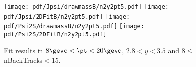 \begin{figure}[H]
\begin{center}
\texttt{[image: pdf/Jpsi/drawmassB/n2y2pt5.pdf]}
\texttt{[image: pdf/Jpsi/2DFitB/n2y2pt5.pdf]}
\vspace*{-0.5cm}
\texttt{[image: pdf/Psi2S/drawmassB/n2y2pt5.pdf]}
\texttt{[image: pdf/Psi2S/2DFitB/n2y2pt5.pdf]}
\vspace*{-0.5cm}
\end{center}
\caption{Fit results in $8\gevc<\pt<20\gevc$, $2.8<y<3.5$ and 8$\leq$nBackTracks$<$15.}
\label{Fitn2y2pt5}
\end{figure}
